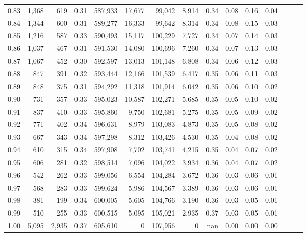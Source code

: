 \begin{tabular}{rrrrrrrrrrrrrrr}
0.83 &   1,368 &    619 &  0.31 &  587,933 &   17,677 &   99,042 &    8,914 &  0.34 &  0.08 &  0.16 &      0.04 \\
0.84 &   1,344 &    600 &  0.31 &  589,277 &   16,333 &   99,642 &    8,314 &  0.34 &  0.08 &  0.15 &      0.03 \\
0.85 &   1,216 &    587 &  0.33 &  590,493 &   15,117 &  100,229 &    7,727 &  0.34 &  0.07 &  0.14 &      0.03 \\
0.86 &   1,037 &    467 &  0.31 &  591,530 &   14,080 &  100,696 &    7,260 &  0.34 &  0.07 &  0.13 &      0.03 \\
0.87 &   1,067 &    452 &  0.30 &  592,597 &   13,013 &  101,148 &    6,808 &  0.34 &  0.06 &  0.12 &      0.03 \\
0.88 &     847 &    391 &  0.32 &  593,444 &   12,166 &  101,539 &    6,417 &  0.35 &  0.06 &  0.11 &      0.03 \\
0.89 &     848 &    375 &  0.31 &  594,292 &   11,318 &  101,914 &    6,042 &  0.35 &  0.06 &  0.10 &      0.02 \\
0.90 &     731 &    357 &  0.33 &  595,023 &   10,587 &  102,271 &    5,685 &  0.35 &  0.05 &  0.10 &      0.02 \\
0.91 &     837 &    410 &  0.33 &  595,860 &    9,750 &  102,681 &    5,275 &  0.35 &  0.05 &  0.09 &      0.02 \\
0.92 &     771 &    402 &  0.34 &  596,631 &    8,979 &  103,083 &    4,873 &  0.35 &  0.05 &  0.08 &      0.02 \\
0.93 &     667 &    343 &  0.34 &  597,298 &    8,312 &  103,426 &    4,530 &  0.35 &  0.04 &  0.08 &      0.02 \\
0.94 &     610 &    315 &  0.34 &  597,908 &    7,702 &  103,741 &    4,215 &  0.35 &  0.04 &  0.07 &      0.02 \\
0.95 &     606 &    281 &  0.32 &  598,514 &    7,096 &  104,022 &    3,934 &  0.36 &  0.04 &  0.07 &      0.02 \\
0.96 &     542 &    262 &  0.33 &  599,056 &    6,554 &  104,284 &    3,672 &  0.36 &  0.03 &  0.06 &      0.01 \\
0.97 &     568 &    283 &  0.33 &  599,624 &    5,986 &  104,567 &    3,389 &  0.36 &  0.03 &  0.06 &      0.01 \\
0.98 &     381 &    199 &  0.34 &  600,005 &    5,605 &  104,766 &    3,190 &  0.36 &  0.03 &  0.05 &      0.01 \\
0.99 &     510 &    255 &  0.33 &  600,515 &    5,095 &  105,021 &    2,935 &  0.37 &  0.03 &  0.05 &      0.01 \\
1.00 &   5,095 &  2,935 &  0.37 &  605,610 &        0 &  107,956 &        0 &   nan &  0.00 &  0.00 &      0.00 \\
\bottomrule
\end{tabular}
